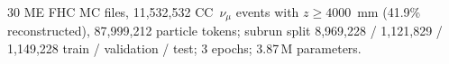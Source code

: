 30 ME FHC MC files, 11{,}532{,}532 CC~$\nu_\mu$ events with $z \ge 4000$~mm (41.9\% reconstructed), 87{,}999{,}212 particle tokens; subrun split 8{,}969{,}228 / 1{,}121{,}829 / 1{,}149{,}228 train / validation / test; 3 epochs; 3.87\,M parameters.
